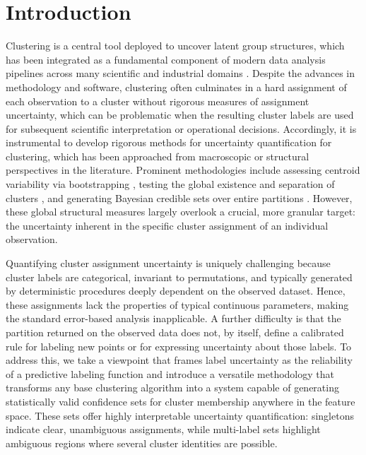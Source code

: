 \documentclass[11pt,letterpaper]{article}
\theoremstyle{definition}
\begin{document}
\section{Introduction}
\label{sec:intro}
Clustering is a central tool deployed to uncover latent group structures, which has been integrated as a fundamental component of modern data analysis pipelines across many scientific and industrial domains \cite{kiselev2019challenges, fortunato2010community}. Despite the advances in methodology and software, clustering often culminates in a hard assignment of each observation to a cluster without rigorous measures of assignment uncertainty, which can be problematic when the resulting cluster labels are used for subsequent scientific interpretation or operational decisions. Accordingly, it is instrumental to develop rigorous methods for uncertainty quantification for clustering, which has been approached from macroscopic or structural perspectives in the literature. Prominent methodologies include assessing centroid variability via bootstrapping \cite{kerr2001bootcluster, hofmans2015bootstrapkmeans, liu2018ukmeans}, testing the global existence and separation of clusters \cite{liu2008statistical, huang2015statistical, kimes2017statistical, shen2024statistical, yun2023selective, chen2023selective, gao2024selective}, and generating Bayesian credible sets over entire partitions \cite{wade2018bayesian, dahl2022search}. However, these global structural measures largely overlook a crucial, more granular target: the uncertainty inherent in the specific cluster assignment of an individual observation. 

Quantifying cluster assignment uncertainty is uniquely challenging because cluster labels are categorical, invariant to permutations, and typically generated by deterministic procedures deeply dependent on the observed dataset. Hence, these assignments lack the properties of typical continuous parameters, making the standard error-based analysis inapplicable. A further difficulty is that the partition returned on the observed data does not, by itself, define a calibrated rule for labeling new points or for expressing uncertainty about those labels. To address this, we take a viewpoint that frames label uncertainty as the reliability of a predictive labeling function and introduce a versatile methodology that transforms any base clustering algorithm into a system capable of generating statistically valid confidence sets for cluster membership anywhere in the feature space. These sets offer highly interpretable uncertainty quantification: singletons indicate clear, unambiguous assignments, while multi-label sets highlight ambiguous regions where several cluster identities are possible.
\end{document}
